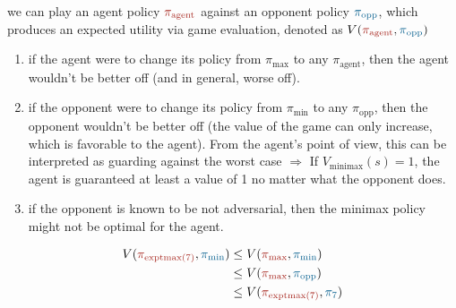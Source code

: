  we can play an agent policy
$\agentcolor{\pi_{\text{agent}}}$ against an opponent policy
$\oppcolor{\pi_{\text{opp}}}$, which produces an expected utility via game
evaluation, denoted as $V(\agentcolor{\pi_{\text{agent}}},
\oppcolor{\pi_{\text{opp}}})$\\
\begin{enumerate}
    \item if the agent were to change its policy from $\pi_{\text{max}}$ to any
        $\pi_{\text{agent}}$, then the agent wouldn't be better off (and in
        general, worse off). 
    \item if the opponent were to change its policy from $\pi_{\text{min}}$ to
        any $\pi_{\text{opp}}$, then the opponent wouldn't be better off (the
        value of the game can only increase, which is favorable to the agent).
        From the agent's point of view, this can be interpreted as guarding
        against the worst case $\Rightarrow$ If $V_{\text{minimax}}(s) = 1$, the
        agent is guaranteed at least a value of 1 no matter what the opponent
        does.
    \item if the opponent is known to be not adversarial, then the minimax
        policy might not be optimal for the agent.
\end{enumerate}
\begin{displaymath}
\begin{split}
V(\agentcolor{\pi_{\text{exptmax}(7)}}, \oppcolor{\pi_{\text{min}}}) &\le V(\agentcolor{\pi_{\text{max}}}, \oppcolor{\pi_{\text{min}}}) \\
&\le V(\agentcolor{\pi_{\text{max}}}, \oppcolor{\pi_{\text{opp}}}) \\
&\le V(\agentcolor{\pi_{\text{exptmax}(7)}}, \oppcolor{\pi_{\text{7}}})
\end{split}
\end{displaymath}

